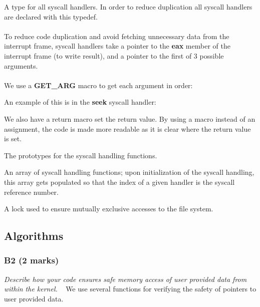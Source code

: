 \documentclass{report}
\newcommand{\question}[1]{\textit{#1} \ }
\newcommand{\fun}[1]{\textcolor{Emerald}{\textbf{#1}}}
\newcommand{\file}[1]{\textcolor{YellowGreen}{\textbf{#1}}}
\newcommand{\var}[1]{\textcolor{RoyalPurple}{\textbf{#1}}}
\newcommand{\const}[1]{\textcolor{BrickRed}{\textbf{#1}}}
\newcommand{\pintoscode}[4]{}
\newcommand{\pintosfile}[3]{\pintoscode{#1}{#2}{\file{#3}}{#3}}
\begin{document}
                \pintosfile{30}{30}{syscall.c}
                A type for all syscall handlers. In order to reduce duplication all syscall handlers are declared with this typedef.
                \\
                \\ To reduce code duplication and avoid fetching unnecessary data from the interrupt frame, syscall handlers take 
                a pointer to the \var{eax} member of the interrupt frame (to write result), and a pointer to the first of 3 possible arguments.
                \\
                \\ We use a \const{GET\_ARG} macro to get each argument in order:
                \pintosfile{19}{24}{syscall.c}

                An example of this is in the \fun{seek} syscall handler:
                \pintosfile{426}{429}{syscall.c}
                
                We also have a return macro set the return value. By using a macro instead of an assignment, the code is made more readable as it is clear where the return value is set.
                \pintosfile{26}{26}{syscall.c}
                            

                \pintosfile{44}{57}{syscall.c}
                The prototypes for the syscall handling functions.

                \pintosfile{59}{59}{syscall.c}
                An array of syscall handling functions; upon initialization of the syscall handling, this array gets populated so 
                that the index of a given handler is the syscall reference number.

                \pintosfile{6}{6}{syscall.h}
                A lock used to ensure mutually exclusive accesses to the file system.

            
        \subsection*{Algorithms}
            \subsubsection*{B2 (2 marks)}
                \question{Describe how your code ensures safe memory access of user provided data from within the kernel.}
                    We use several functions for verifying the safety of pointers to user provided data.
                    \pintosfile{146}{159}{syscall.c}
\end{document}
